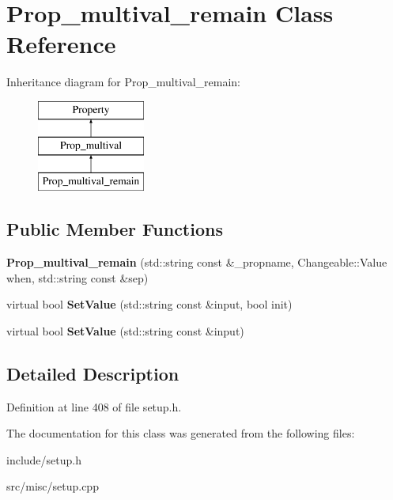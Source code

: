 \hypertarget{classProp__multival__remain}{\section{Prop\-\_\-multival\-\_\-remain Class Reference}
\label{classProp__multival__remain}
}
Inheritance diagram for Prop\-\_\-multival\-\_\-remain\-:\begin{figure}[H]
\begin{center}
\leavevmode
\includegraphics[height=3.000000cm]{classProp__multival__remain}
\end{center}
\end{figure}
\subsection*{Public Member Functions}
\begin{DoxyCompactItemize}
\item 
\hypertarget{classProp__multival__remain_a59450ef7be09d83d29831c5c378d79ad}{{\bfseries Prop\-\_\-multival\-\_\-remain} (std\-::string const \&\-\_\-propname, Changeable\-::\-Value when, std\-::string const \&sep)}\label{classProp__multival__remain_a59450ef7be09d83d29831c5c378d79ad}

\item 
\hypertarget{classProp__multival__remain_a73ff08a986693c879b330654de3152cc}{virtual bool {\bfseries Set\-Value} (std\-::string const \&input, bool init)}\label{classProp__multival__remain_a73ff08a986693c879b330654de3152cc}

\item 
\hypertarget{classProp__multival__remain_ac6f943a59a58acf45efe4c0ee51f3948}{virtual bool {\bfseries Set\-Value} (std\-::string const \&input)}\label{classProp__multival__remain_ac6f943a59a58acf45efe4c0ee51f3948}

\end{DoxyCompactItemize}


\subsection{Detailed Description}


Definition at line 408 of file setup.\-h.



The documentation for this class was generated from the following files\-:\begin{DoxyCompactItemize}
\item 
include/setup.\-h\item 
src/misc/setup.\-cpp\end{DoxyCompactItemize}
